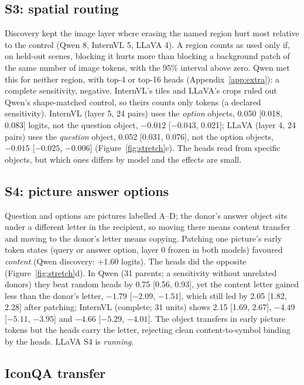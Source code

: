 \documentclass[11pt]{article}
\begin{document}
\subsection{S3: spatial routing}

Discovery kept the image layer where erasing the named region hurt most relative to the control (Qwen 8, InternVL 5, LLaVA 4). A region counts as used only if, on held-out scenes, blocking it hurts more than blocking a background patch of the same number of image tokens, with the 95\% interval above zero. Qwen met this for neither region, with top-4 or top-16 heads (Appendix~\ref{app:extra}): a complete sensitivity, negative. InternVL's tiles and LLaVA's crops ruled out Qwen's shape-matched control, so theirs counts only tokens (a declared sensitivity). InternVL (layer 5, 24 pairs) uses the \emph{option} objects, 0.050 [0.018, 0.083] logits, not the question object, $-0.012$ [$-0.043$, 0.021]; LLaVA (layer 4, 24 pairs) uses the \emph{question} object, 0.052 [0.031, 0.076], not the option objects, $-0.015$ [$-0.025$, $-0.006$] (Figure~\ref{fig:stretch}c). The heads read from specific objects, but which ones differs by model and the effects are small.

\subsection{S4: picture answer options}

Question and options are pictures labelled A--D; the donor's answer object sits under a different letter in the recipient, so moving there means content transfer and moving to the donor's letter means copying. Patching one picture's early token states (query or answer option, layer 0 frozen in both models) favoured \emph{content} (Qwen discovery: +1.60 logits). The heads did the opposite (Figure~\ref{fig:stretch}d). In Qwen (31 parents; a sensitivity without unrelated donors) they beat random heads by 0.75 [0.56, 0.93], yet the content letter gained less than the donor's letter, $-1.79$ [$-2.09$, $-1.51$], which still led by 2.05 [1.82, 2.28] after patching; InternVL (complete; 31 units) shows 2.15 [1.69, 2.67], $-4.49$ [$-5.11$, $-3.95$] and $-4.66$ [$-5.29$, $-4.01$]. The object transfers in early picture tokens but the heads carry the letter, rejecting clean content-to-symbol binding by the heads. LLaVA S4 is \emph{running}.

\subsection{IconQA transfer}
\end{document}
